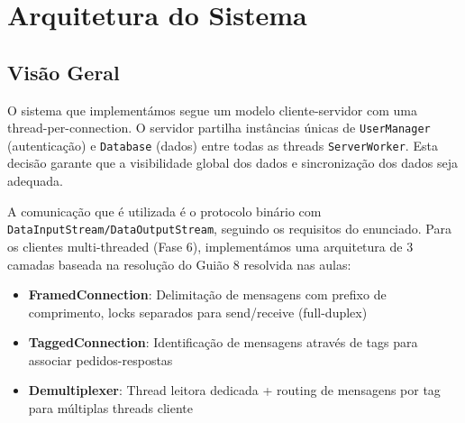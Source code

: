 \documentclass[11pt,a4paper]{article}
\begin{document}
\section{Arquitetura do Sistema}

\subsection{Visão Geral}

O sistema que implementámos segue um modelo cliente-servidor com uma thread-per-connection. O servidor partilha instâncias únicas de \texttt{UserManager} (autenticação) e \texttt{Database} (dados) entre todas as threads \texttt{ServerWorker}. Esta decisão garante que a visibilidade global dos dados e sincronização dos dados seja adequada.

A comunicação que é utilizada é o protocolo binário com \texttt{DataInputStream/DataOutputStream}, seguindo os requisitos do enunciado. Para os clientes multi-threaded (Fase 6), implementámos uma arquitetura de 3 camadas baseada na resolução do Guião 8 resolvida nas aulas:

\begin{itemize}[noitemsep]
    \item \textbf{FramedConnection}: Delimitação de mensagens com prefixo de comprimento, locks separados para send/receive (full-duplex)
    \item \textbf{TaggedConnection}: Identificação de mensagens através de tags para associar pedidos-respostas
    \item \textbf{Demultiplexer}: Thread leitora dedicada + routing de mensagens por tag para múltiplas threads cliente
\end{itemize}
\end{document}
